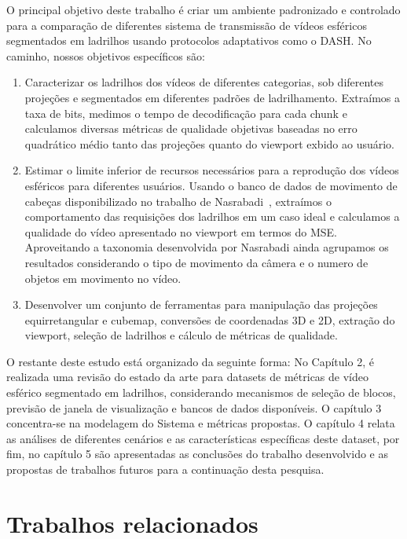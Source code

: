 O principal objetivo deste trabalho é criar um ambiente padronizado e controlado para a comparação de diferentes sistema de transmissão de vídeos esféricos segmentados em ladrilhos usando protocolos adaptativos como o DASH. No caminho, nossos objetivos específicos são: 

\begin{enumerate}
	\item Caracterizar os ladrilhos dos vídeos de diferentes categorias, sob diferentes projeções e segmentados em diferentes padrões de ladrilhamento. Extraímos a taxa de bits, medimos o tempo de decodificação para cada chunk e calculamos diversas métricas de qualidade objetivas baseadas no erro quadrático médio tanto das projeções quanto do viewport exbido ao usuário.
	
	\item Estimar o limite inferior de recursos necessários para a reprodução dos vídeos esféricos para diferentes usuários. Usando o banco de dados de movimento de cabeças disponibilizado no trabalho de Nasrabadi~\cite{Nasrabadi2019}, extraímos o comportamento das requisições dos ladrilhos em um caso ideal e calculamos a qualidade do vídeo apresentado no viewport em termos do MSE. Aproveitando a taxonomia desenvolvida por Nasrabadi ainda agrupamos os resultados considerando o tipo de movimento da câmera e o numero de objetos em movimento no vídeo.
	
	\item Desenvolver um conjunto de ferramentas para manipulação das projeções equirretangular e cubemap, conversões de coordenadas 3D e 2D, extração do viewport, seleção de ladrilhos e cálculo de métricas de qualidade.
\end{enumerate}

O restante deste estudo está organizado da seguinte forma: No Capítulo 2, é realizada uma revisão do estado da arte para datasets de métricas de vídeo esférico segmentado em ladrilhos, considerando mecanismos de seleção de blocos, previsão de janela de visualização e bancos de dados disponíveis. O capítulo 3 concentra-se na modelagem do Sistema e métricas propostas. O capítulo 4 relata as análises de diferentes cenários e as características específicas deste dataset, por fim, no capítulo 5 são apresentadas as conclusões do trabalho desenvolvido e as propostas de trabalhos futuros para a continuação desta pesquisa.


 \chapter{Trabalhos relacionados}


